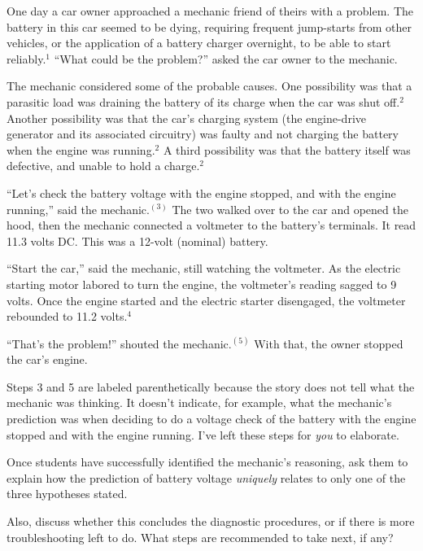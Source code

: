 \vskip 10pt {\narrower \noindent \baselineskip5pt

One day a car owner approached a mechanic friend of theirs with a problem.  The battery in this car seemed to be dying, requiring frequent jump-starts from other vehicles, or the application of a battery charger overnight, to be able to start reliably.$^{1}$  ``What could be the problem?'' asked the car owner to the mechanic.

\vskip 5pt

The mechanic considered some of the probable causes.  One possibility was that a parasitic load was draining the battery of its charge when the car was shut off.$^{2}$  Another possibility was that the car's charging system (the engine-drive generator and its associated circuitry) was faulty and not charging the battery when the engine was running.$^{2}$  A third possibility was that the battery itself was defective, and unable to hold a charge.$^{2}$ 

\vskip 5pt

``Let's check the battery voltage with the engine stopped, and with the engine running,'' said the mechanic.$^{(3)}$  The two walked over to the car and opened the hood, then the mechanic connected a voltmeter to the battery's terminals.  It read 11.3 volts DC.  This was a 12-volt (nominal) battery.

\vskip 5pt

``Start the car,'' said the mechanic, still watching the voltmeter.  As the electric starting motor labored to turn the engine, the voltmeter's reading sagged to 9 volts.  Once the engine started and the electric starter disengaged, the voltmeter rebounded to 11.2 volts.$^{4}$

\vskip 5pt

``That's the problem!'' shouted the mechanic.$^{(5)}$  With that, the owner stopped the car's engine.

\par} \vskip 10pt

Steps 3 and 5 are labeled parenthetically because the story does not tell what the mechanic was thinking.  It doesn't indicate, for example, what the mechanic's prediction was when deciding to do a voltage check of the battery with the engine stopped and with the engine running.  I've left these steps for {\it you} to elaborate.







Once students have successfully identified the mechanic's reasoning, ask them to explain how the prediction of battery voltage {\it uniquely} relates to only one of the three hypotheses stated.

Also, discuss whether this concludes the diagnostic procedures, or if there is more troubleshooting left to do.  What steps are recommended to take next, if any?




